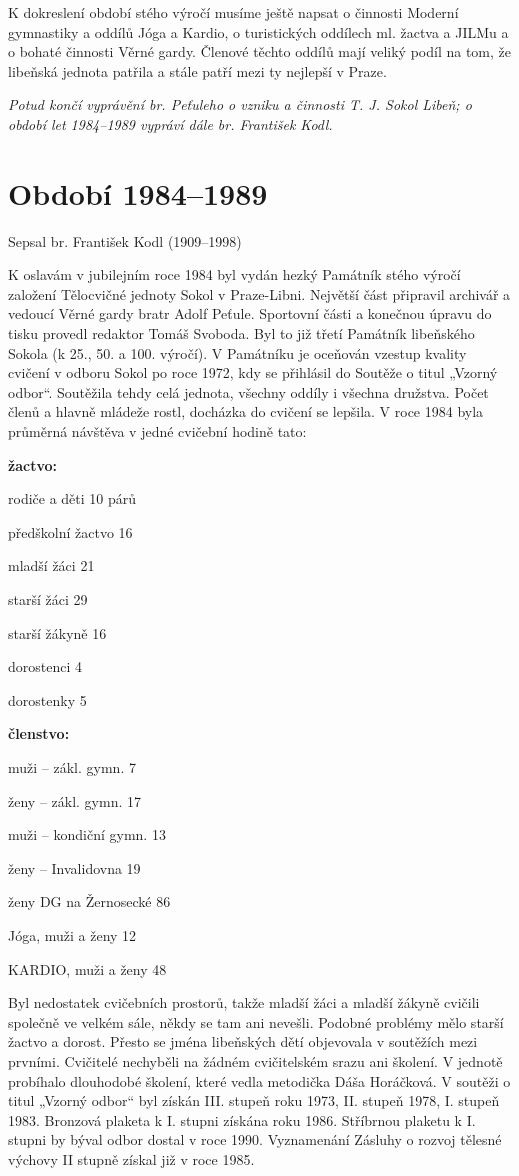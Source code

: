 K dokreslení období stého výročí musíme ještě napsat o činnosti Moderní
gymnastiky a oddílů Jóga a Kardio, o turistických oddílech ml. žactva a
JILMu a o bohaté činnosti Věrné gardy. Členové těchto oddílů mají veliký
podíl na tom, že libeňská jednota patřila a stále patří mezi ty nejlepší
v Praze.

\emph{Potud končí vyprávění br. Peťuleho o vzniku a činnosti T. J. Sokol
Libeň; o období let 1984--1989 vypráví dále br. František Kodl.}

\section{Období 1984--1989}\label{obdobuxed-19841989}

Sepsal br. František Kodl (1909--1998)

K oslavám v jubilejním roce 1984 byl vydán hezký Památník stého výročí
založení Tělocvičné jednoty Sokol v Praze-Libni. Největší část připravil
archivář a vedoucí Věrné gardy bratr Adolf Peťule. Sportovní části a
konečnou úpravu do tisku provedl redaktor Tomáš Svoboda. Byl to již
třetí Památník libeňského Sokola (k 25., 50. a 100. výročí). V Památníku
je oceňován vzestup kvality cvičení v odboru Sokol po roce 1972, kdy se
přihlásil do Soutěže o titul „Vzorný odbor``. Soutěžila tehdy celá
jednota, všechny oddíly i všechna družstva. Počet členů a hlavně mládeže
rostl, docházka do cvičení se lepšila. V roce 1984 byla průměrná
návštěva v jedné cvičební hodině tato:

\textbf{žactvo:}

rodiče a děti 10 párů

předškolní žactvo 16

mladší žáci 21

starší žáci 29

starší žákyně 16

dorostenci 4

dorostenky 5

\textbf{členstvo:}

muži -- zákl. gymn. 7

ženy -- zákl. gymn. 17

muži -- kondiční gymn. 13

ženy -- Invalidovna 19

ženy DG na Žernosecké 86

Jóga, muži a ženy 12

KARDIO, muži a ženy 48

Byl nedostatek cvičebních prostorů, takže mladší žáci a mladší žákyně
cvičili společně ve velkém sále, někdy se tam ani nevešli. Podobné
problémy mělo starší žactvo a dorost. Přesto se jména libeňských dětí
objevovala v soutěžích mezi prvními. Cvičitelé nechyběli na žádném
cvičitelském srazu ani školení. V jednotě probíhalo dlouhodobé školení,
které vedla metodička Dáša Horáčková. V soutěži o titul „Vzorný odbor``
byl získán III. stupeň roku 1973, II. stupeň 1978, I. stupeň 1983.
Bronzová plaketa k I. stupni získána roku 1986. Stříbrnou plaketu k I.
stupni by býval odbor dostal v roce 1990. Vyznamenání Zásluhy o rozvoj
tělesné výchovy II stupně získal již v roce 1985.

